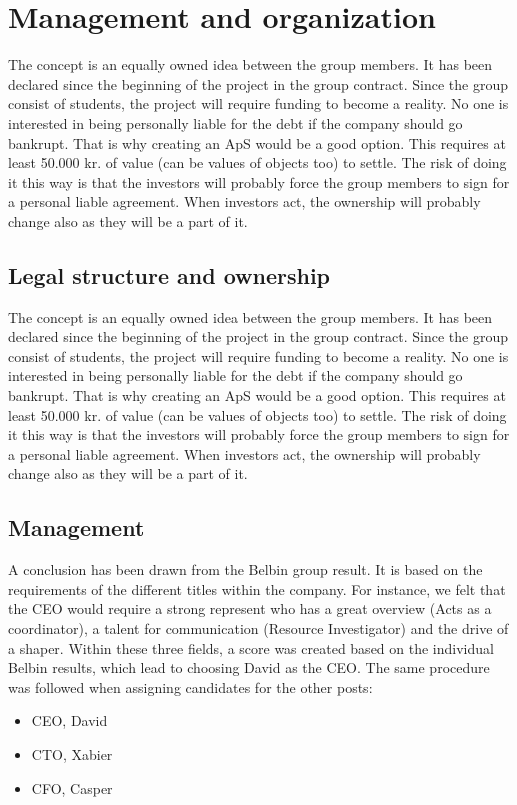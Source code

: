 \section{Management and organization}
The concept is an equally owned idea between the group members. It has been declared since the beginning of the project in the group contract.
Since the group consist of students, the project will require funding to become a reality. No one is interested in being personally liable for the debt if the company should go bankrupt. That is why creating an ApS would be a good option. This requires at least 50.000 kr. of value (can be values of objects too) to settle. The risk of doing it this way is that the investors will probably force the group members to sign for a personal liable agreement. 
When investors act, the ownership will probably change also as they will be a part of it.

\subsection{Legal structure and ownership}
The concept is an equally owned idea between the group members. It has been declared since the beginning of the project in the group contract.
Since the group consist of students, the project will require funding to become a reality. No one is interested in being personally liable for the debt if the company should go bankrupt. That is why creating an ApS would be a good option. This requires at least 50.000 kr. of value (can be values of objects too) to settle. The risk of doing it this way is that the investors will probably force the group members to sign for a personal liable agreement. 
When investors act, the ownership will probably change also as they will be a part of it.


\subsection{Management}
A conclusion has been drawn from the Belbin group result. It is based on the requirements of the different titles within the company.  For instance, we felt that the CEO would require a strong represent who has a great overview (Acts as a coordinator), a talent for communication (Resource Investigator) and the drive of a shaper. Within these three fields, a score was created based on the individual Belbin results, which lead to choosing David as the CEO. 
The same procedure was followed when assigning candidates for the other posts:
\begin{itemize}
\item CEO, David
\item CTO, Xabier
\item CFO, Casper
\end{itemize}

